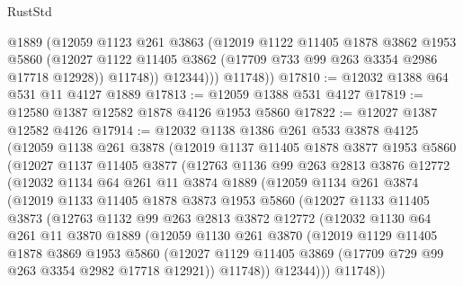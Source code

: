 \begin{lexlean}{RustStd}
\begin{coremodule}
{\begin{coremodule}
{{{{{{{{{{{{{{{{{{{{{{{{{{{{{              @1889
              (@12059
                @1123
                @261
                @3863
                (@12019
                  @1122
                  @11405
                  @1878
                  @3862
                  @1953
                  @5860
                  (@12027 @1122 @11405 @3862 (@17709 @733 @99 @263 @3354 @2986 @17718 @12928))
                  @11748))
              @12344)))
        @11748))
@17810 := @12032 @1388 @64 @531 @11 @4127 @1889
@17813 := @12059 @1388 @531 @4127
@17819 := @12580 @1387 @12582 @1878 @4126 @1953 @5860
@17822 := @12027 @1387 @12582 @4126
@17914 := @12032
    @1138
    @1386
    @261
    @533
    @3878
    @4125
    (@12059
      @1138
      @261
      @3878
      (@12019
        @1137
        @11405
        @1878
        @3877
        @1953
        @5860
        (@12027
          @1137
          @11405
          @3877
          (@12763
            @1136
            @99
            @263
            @2813
            @3876
            @12772
            (@12032
              @1134
              @64
              @261
              @11
              @3874
              @1889
              (@12059
                @1134
                @261
                @3874
                (@12019
                  @1133
                  @11405
                  @1878
                  @3873
                  @1953
                  @5860
                  (@12027
                    @1133
                    @11405
                    @3873
                    (@12763
                      @1132
                      @99
                      @263
                      @2813
                      @3872
                      @12772
                      (@12032
                        @1130
                        @64
                        @261
                        @11
                        @3870
                        @1889
                        (@12059
                          @1130
                          @261
                          @3870
                          (@12019
                            @1129
                            @11405
                            @1878
                            @3869
                            @1953
                            @5860
                            (@12027
                              @1129
                              @11405
                              @3869
                              (@17709 @729 @99 @263 @3354 @2982 @17718 @12921))
                            @11748))
                        @12344)))
                  @11748))
}}}}}}}}}}}}}}}}}}}}}}}}}}}}}
\end{coremodule}}
\end{coremodule}
\end{lexlean}
